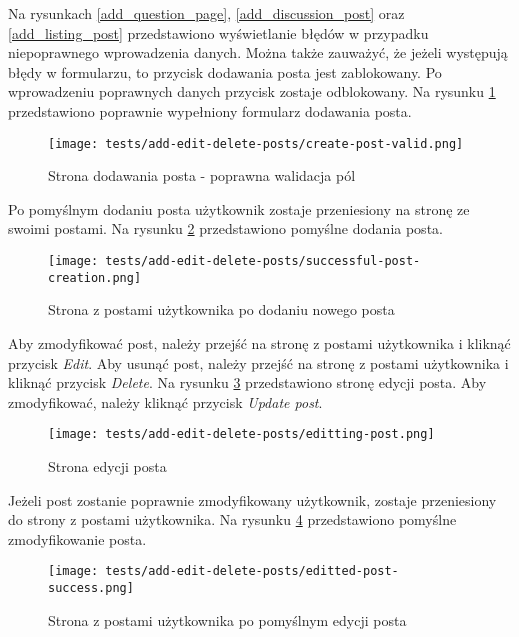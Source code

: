 Na rysunkach \ref{add_question_page}, \ref{add_discussion_post} oraz \ref{add_listing_post} przedstawiono wyświetlanie błędów w przypadku niepoprawnego wprowadzenia danych. Można także zauważyć, że jeżeli występują błędy w formularzu, to przycisk dodawania posta jest zablokowany. Po wprowadzeniu poprawnych danych przycisk zostaje odblokowany. Na rysunku \ref{add_valid_post} przedstawiono poprawnie wypełniony formularz dodawania posta.
\begin{figure}[H]
  \centering
  \texttt{[image: tests/add-edit-delete-posts/create-post-valid.png]}
  \caption{Strona dodawania posta - poprawna walidacja pól}
  \label{add_valid_post}
\end{figure}
Po pomyślnym dodaniu posta użytkownik zostaje przeniesiony na stronę ze swoimi postami. Na rysunku \ref{add_post_success} przedstawiono pomyślne dodania posta.
\begin{figure}[H]
  \centering
  \texttt{[image: tests/add-edit-delete-posts/successful-post-creation.png]}
  \caption{Strona z postami użytkownika po dodaniu nowego posta}
  \label{add_post_success}
\end{figure}
Aby zmodyfikować post, należy przejść na stronę z postami użytkownika i kliknąć przycisk \textit{Edit}. Aby usunąć post, należy przejść na stronę z postami użytkownika i kliknąć przycisk \textit{Delete}. Na rysunku \ref{edit_post} przedstawiono stronę edycji posta. Aby zmodyfikować, należy kliknąć przycisk \textit{Update post}. 
\begin{figure}[H]
  \centering
  \texttt{[image: tests/add-edit-delete-posts/editting-post.png]}
  \caption{Strona edycji posta}
  \label{edit_post}
\end{figure}
Jeżeli post zostanie poprawnie zmodyfikowany użytkownik, zostaje przeniesiony do strony z postami użytkownika. Na rysunku \ref{edit_post_success} przedstawiono pomyślne zmodyfikowanie posta.
\begin{figure}[H]
  \centering
  \texttt{[image: tests/add-edit-delete-posts/editted-post-success.png]}
  \caption{Strona z postami użytkownika po pomyślnym edycji posta}
  \label{edit_post_success}
\end{figure}

